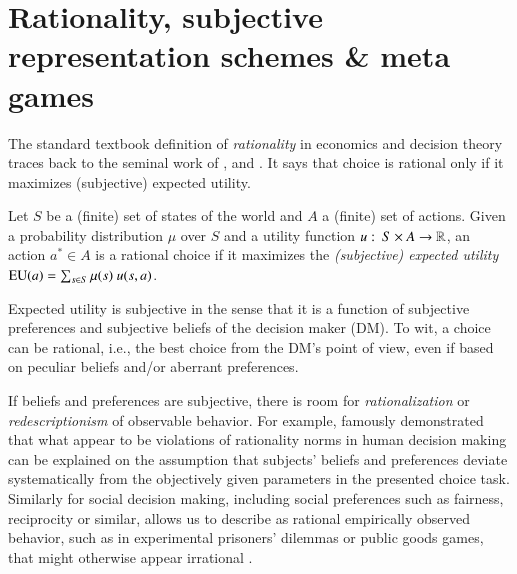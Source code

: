 \documentclass[fleqn,reqno,11pt]{article}
\begin{document}


\section{Rationality, subjective representation schemes \& meta games}
\label{sec:rati--subj}

The standard textbook definition of \textit{rationality} in economics and decision theory
traces back to the seminal work of \citet{deFinetti37}, \citet{Neumannvon-NeumannMorgenstern1944:Theory-of-Games}
and \citet{Savage1954:The-Foundations}. It says that choice is rational only if it maximizes
(subjective) expected utility.

\begin{definition}
  \label{def:rationality}
  Let $S$ be a (finite) set of states of the world and $A$ a (finite) set of actions. Given a
  probability distribution $\mu$ over $S$ and a utility function
  $u \thinspace \colon \thinspace S \times A \rightarrow \mathbb{R} $, an action $a^* \in A$ is a rational choice
 if it maximizes the \emph{(subjective) expected utility} 
  $\EU(a) = \sum_{s \in S} \mu(s) \ u(s, a)$.
\end{definition}

\noindent Expected utility is subjective in the sense that it is a function of subjective
preferences and subjective beliefs of the decision maker (DM). To wit, a choice can be
rational, i.e., the best choice from the DM's point of view, even if based on peculiar beliefs
and/or aberrant preferences. %

If beliefs and preferences are subjective, there is room for \emph{rationalization} or
\emph{redescriptionism} of observable behavior. For example,
\citet{KahnemannTversky1979:Prospect-Theory} famously demonstrated that what appear to be
violations of rationality norms in human decision making can be explained on the assumption
that subjects' beliefs and preferences deviate systematically from the objectively given
parameters in the presented choice task. Similarly for social decision making, including social
preferences such as fairness, reciprocity or similar, allows us to describe as rational
empirically observed behavior, such as in experimental prisoners' dilemmas or public goods
games, that might otherwise appear irrational \citep[e.g.,][]{fehrschmidt99,charrab02}.
\end{document}
